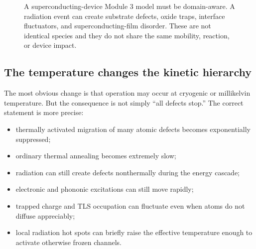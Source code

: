 \documentclass[11pt]{article}
\begin{document}
\begin{figure}[h]
\centering
{}
\caption{A superconducting-device Module 3 model must be domain-aware. A radiation event can create substrate defects, oxide traps, interface fluctuators, and superconducting-film disorder. These are not identical species and they do not share the same mobility, reaction, or device impact.}
\label{fig:hybrid_domains_m3}
\end{figure}

\subsection{The temperature changes the kinetic hierarchy}

The most obvious change is that operation may occur at cryogenic or millikelvin temperature. But the consequence is not simply ``all defects stop.'' The correct statement is more precise:
\begin{itemize}
\item thermally activated migration of many atomic defects becomes exponentially suppressed;
\item ordinary thermal annealing becomes extremely slow;
\item radiation can still create defects nonthermally during the energy cascade;
\item electronic and phononic excitations can still move rapidly;
\item trapped charge and TLS occupation can fluctuate even when atoms do not diffuse appreciably;
\item local radiation hot spots can briefly raise the effective temperature enough to activate otherwise frozen channels.
\end{itemize}
\end{document}
